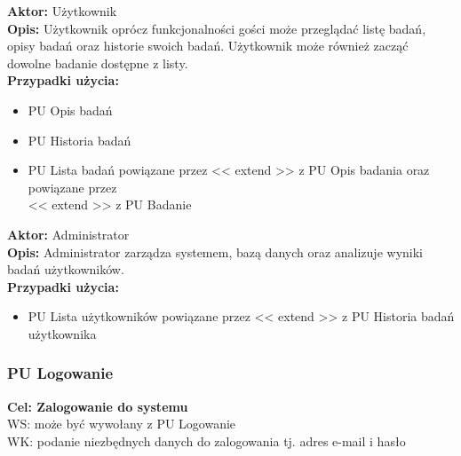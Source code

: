 \documentclass[12pt, letterpaper]{article}
\begin{document}
		\vspace{1cm}
		
		\textbf{Aktor:} Użytkownik\\
		
		\textbf{Opis:} Użytkownik oprócz funkcjonalności gości może przeglądać listę badań, opisy badań oraz historie swoich badań. Użytkownik może również zacząć dowolne badanie dostępne z listy.\\
		
		\textbf{Przypadki użycia:}
		
		\begin{itemize}
			\item PU Opis badań
			\item PU Historia badań
			\item PU Lista badań powiązane przez << extend >> z PU Opis badania oraz powiązane przez\\ << extend >> z PU Badanie
		\end{itemize}
		
		\vspace{1cm}
		
		\textbf{Aktor:} Administrator\\
		
		\textbf{Opis:} Administrator zarządza systemem, bazą danych oraz analizuje wyniki badań użytkowników.\\
		
		\textbf{Przypadki użycia:}
		
		\begin{itemize}
			\item PU Lista użytkowników powiązane przez << extend >> z PU Historia badań użytkownika
		\end{itemize}		
		
		\newpage
		
		
		
		\subsubsection{PU Logowanie}
		
		\quad
		
		\textbf{Cel: Zalogowanie do systemu}\\
		
		WS: może być wywołany z PU Logowanie\\
		
		WK: podanie niezbędnych danych do zalogowania tj. adres e-mail i hasło\\
		
\end{document}
